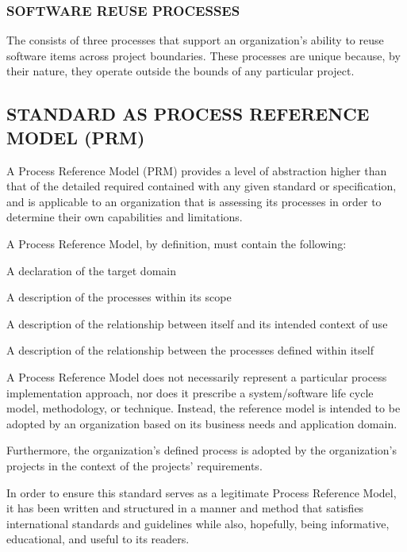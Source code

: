 		\subsubsection{SOFTWARE REUSE PROCESSES}
		\begin{adjustwidth}{1em}{0pt}

			The  consists of three processes that support an organization's ability to reuse software items across project boundaries. These processes are unique because, by their nature, they operate outside the bounds of any particular project.

		\end{adjustwidth}


	\subsection{STANDARD AS PROCESS REFERENCE MODEL (PRM)}
	\begin{adjustwidth}{0.5em}{0pt}

		A Process Reference Model (PRM) provides a level of abstraction higher than that of the detailed required contained with any given standard or specification, and is applicable to an organization that is assessing its processes in order to determine their own capabilities and limitations. 
		
		A Process Reference Model, by definition, must contain the following:

		\begin{compactenum}

			\item A declaration of the target domain

			\item A description of the processes within its scope

			\item A description of the relationship between itself and its intended context of use

			\item A description of the relationship between the processes defined within itself

		\end{compactenum}


		A Process Reference Model does not necessarily represent a particular process implementation approach, nor does it prescribe a system/software life cycle model, methodology, or technique. Instead, the reference model is intended to be adopted by an organization based on its business needs and application domain. 

		Furthermore, the organization's defined process is adopted by the organization's projects in the context of the projects' requirements. 

		In order to ensure this standard serves as a legitimate Process Reference Model, it has been written and structured in a manner and method that satisfies international standards and guidelines while also, hopefully, being informative, educational, and useful to its readers. 

	\end{adjustwidth}